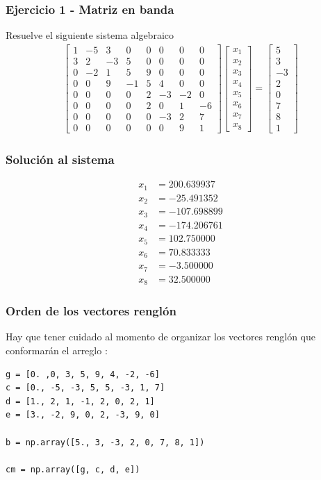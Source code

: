 \begin{frame}[plain]
\frametitle{Ejercicio 1 - Matriz en banda}
Resuelve el siguiente sistema algebraico
\begin{align*}
\begin{bmatrix}
1 & -5 & 3 & 0 & 0 & 0 & 0 & 0 \\
3 & 2 & -3 & 5 & 0 & 0 & 0 & 0 \\
0 & -2 & 1 & 5 & 9 & 0 & 0 & 0 \\
0 & 0 & 9 & -1 & 5 & 4 & 0 & 0 \\
0 & 0 & 0 & 0 & 2 & -3 & -2 & 0 \\
0 & 0 & 0 & 0 & 2 & 0 & 1 & -6 \\
0 & 0 & 0 & 0 & 0 & -3 & 2 & 7 \\
0 & 0 & 0 & 0 & 0 & 0 & 9 & 1 
\end{bmatrix}
\begin{bmatrix}
x_{1} \\
x_{2} \\
x_{3} \\
x_{4} \\
x_{5} \\
x_{6} \\
x_{7} \\
x_{8}
\end{bmatrix}
=
\begin{bmatrix}
5 \\
3 \\
-3 \\
2 \\
0 \\
7 \\
8 \\
1
\end{bmatrix}
\end{align*}
\end{frame}
\begin{frame}
\frametitle{Solución al sistema}
\begin{align*}
x_{1} &= 200.639937 \\
x_{2} &= -25.491352 \\
x_{3} &= -107.698899 \\
x_{4} &= -174.206761 \\
x_{5} &= 102.750000 \\
x_{6} &= 70.833333 \\
x_{7} &= -3.500000 \\
x_{8} &= 32.500000
\end{align*}
\end{frame}
\begin{frame}
\frametitle{Orden de los vectores renglón}
Hay que tener cuidado al momento de organizar los vectores renglón que conformarán el arreglo :
\begin{lstlisting}[caption=Definición de los vectores renglón, style=FormattedNumber, basicstyle=\linespread{1.1}\ttfamily=\small, columns=fullflexible]
g = [0. ,0, 3, 5, 9, 4, -2, -6]
c = [0., -5, -3, 5, 5, -3, 1, 7]
d = [1., 2, 1, -1, 2, 0, 2, 1]
e = [3., -2, 9, 0, 2, -3, 9, 0]

b = np.array([5., 3, -3, 2, 0, 7, 8, 1])

cm = np.array([g, c, d, e])
\end{lstlisting}
\end{frame}
